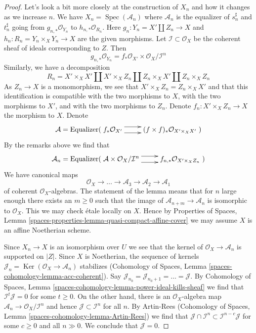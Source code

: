 \documentclass{stacks-project}
\theoremstyle{plain}
\theoremstyle{definition}
\theoremstyle{remark}
\numberwithin{equation}{subsection}
\def\Spec{\mathop{\mathrm{Spec}}}
\def\Ker{\mathop{\mathrm{Ker}}}
\begin{document}
\begin{proof}
Let's look a bit more closely at the construction of $X_n$
and how it changes as we increase $n$. We have
$X_n = \underline{\Spec}(\mathcal{A}_n)$
where $\mathcal{A}_n$ is the equalizer of $s_n^\sharp$ and $t_n^\sharp$
going from $g_{n , *}\mathcal{O}_{Y_n}$ to $h_{n, *}\mathcal{O}_{R_n}$.
Here $g_n : Y_n = X' \amalg Z_n \to X$ and $h_n : R_n = Y_n \times_X Y_n \to X$
are the given morphisms. Let $\mathcal{I} \subset \mathcal{O}_X$ be the
coherent sheaf of ideals corresponding to $Z$. Then
$$
g_{n, *}\mathcal{O}_{Y_n} =
f_*\mathcal{O}_{X'} \times \mathcal{O}_X/\mathcal{I}^n
$$
Similarly, we have a decomposition
$$
R_n = X' \times_X X' \amalg X' \times_X Z_n \amalg
Z_n \times_X X' \amalg Z_n \times_X Z_n
$$
As $Z_n \to X$ is a monomorphism, we see that
$X' \times_X Z_n = Z_n \times_X X'$ and that this identification
is compatible with the two morphisms to $X$, with the two morphisms to
$X'$, and with the two morphisms to $Z_n$.
Denote $f_n : X' \times_X Z_n \to X$ the morphism to $X$.
Denote
$$
\mathcal{A} = \text{Equalizer}(
\xymatrix{
f_*\mathcal{O}_{X'} \ar@<1ex>[r] \ar@<-1ex>[r] &
(f \times f)_*\mathcal{O}_{X' \times_X X'}
}
)
$$
By the remarks above we find that
$$
\mathcal{A}_n =
\text{Equalizer}(
\xymatrix{
\mathcal{A} \times \mathcal{O}_X/\mathcal{I}^n \ar@<1ex>[r] \ar@<-1ex>[r] &
f_{n, *}\mathcal{O}_{X' \times_X Z_n}
}
)
$$
We have canonical maps
$$
\mathcal{O}_X \to \ldots \to \mathcal{A}_3 \to \mathcal{A}_2 \to \mathcal{A}_1
$$
of coherent $\mathcal{O}_X$-algebras. The statement of the lemma means that
for $n$ large enough there exists an $m \geq 0$ such that the image of
$\mathcal{A}_{n + m} \to \mathcal{A}_n$ is isomorphic to $\mathcal{O}_X$.
This we may check \'etale locally on $X$. Hence by Properties of Spaces,
Lemma \ref{spaces-properties-lemma-quasi-compact-affine-cover}
we may assume $X$ is an affine Noetherian scheme.

\medskip\noindent
Since $X_n \to X$ is an isomorphism over $U$ we see that the kernel
of $\mathcal{O}_X \to \mathcal{A}_n$ is supported on $|Z|$.
Since $X$ is Noetherian, the sequence of kernels
$\mathcal{J}_n = \Ker(\mathcal{O}_X \to \mathcal{A}_n)$ stabilizes
(Cohomology of Spaces, Lemma \ref{spaces-cohomology-lemma-acc-coherent}).
Say $\mathcal{J}_{n_0} = \mathcal{J}_{n_0 + 1} = \ldots = \mathcal{J}$.
By Cohomology of Spaces, Lemma
\ref{spaces-cohomology-lemma-power-ideal-kills-sheaf}
we find that $\mathcal{I}^t \mathcal{J} = 0$ for some $t \geq 0$.
On the other hand, there is an $\mathcal{O}_X$-algebra map
$\mathcal{A}_n \to \mathcal{O}_X/\mathcal{I}^n$
and hence $\mathcal{J} \subset \mathcal{I}^n$ for all $n$.
By Artin-Rees (Cohomology of Spaces, Lemma
\ref{spaces-cohomology-lemma-Artin-Rees}) we find that
$\mathcal{J} \cap \mathcal{I}^n \subset \mathcal{I}^{n - c}\mathcal{J}$
for some $c  \geq 0$ and all $n \gg 0$. We conclude that $\mathcal{J} = 0$.


\end{proof}
\end{document}
